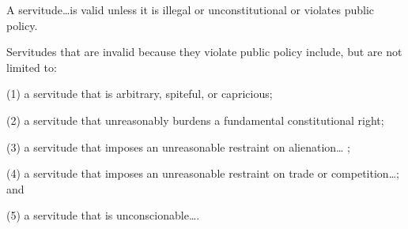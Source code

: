 

A servitude\ldots is valid unless it is illegal or unconstitutional or violates
public policy.

Servitudes that are invalid because they violate public policy include, but are
not limited to:
\begin{statute}
\item (1) a servitude that is arbitrary, spiteful, or capricious;

\item (2) a servitude that unreasonably burdens a fundamental constitutional
right;

\item (3) a servitude that imposes an unreasonable restraint on alienation\ldots
;

\item (4) a servitude that imposes an unreasonable restraint on trade or
competition\ldots ; and

(5) a servitude that is unconscionable\ldots .
\end{statute}

